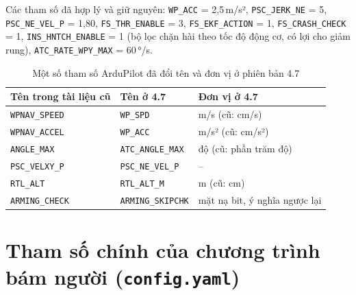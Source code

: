 Các tham số đã hợp lý và giữ nguyên: \texttt{WP\_ACC} = 2,5\,m/s², \texttt{PSC\_JERK\_NE} = 5, \texttt{PSC\_NE\_VEL\_P} = 1,80, \texttt{FS\_THR\_ENABLE} = 3, \texttt{FS\_EKF\_ACTION} = 1, \texttt{FS\_CRASH\_CHECK} = 1, \texttt{INS\_HNTCH\_ENABLE} = 1 (bộ lọc chặn hài theo tốc độ động cơ, có lợi cho giảm rung), \texttt{ATC\_RATE\_WPY\_MAX} = 60\,°/s.

\begin{table}[H]
\centering
\caption{Một số tham số ArduPilot đã đổi tên và đơn vị ở phiên bản 4.7}
\label{tab:pldoiten}
\small
\renewcommand{\arraystretch}{1.15}
\begin{tabular}{@{}lll@{}}
\toprule
\textbf{Tên trong tài liệu cũ} & \textbf{Tên ở 4.7} & \textbf{Đơn vị ở 4.7}\\
\midrule
\texttt{WPNAV\_SPEED} & \texttt{WP\_SPD} & m/s (cũ: cm/s)\\
\texttt{WPNAV\_ACCEL} & \texttt{WP\_ACC} & m/s² (cũ: cm/s²)\\
\texttt{ANGLE\_MAX} & \texttt{ATC\_ANGLE\_MAX} & độ (cũ: phần trăm độ)\\
\texttt{PSC\_VELXY\_P} & \texttt{PSC\_NE\_VEL\_P} & --\\
\texttt{RTL\_ALT} & \texttt{RTL\_ALT\_M} & m (cũ: cm)\\
\texttt{ARMING\_CHECK} & \texttt{ARMING\_SKIPCHK} & mặt nạ bit, ý nghĩa ngược lại\\
\bottomrule
\end{tabular}
\end{table}

\section{Tham số chính của chương trình bám người (\texttt{config.yaml})}

